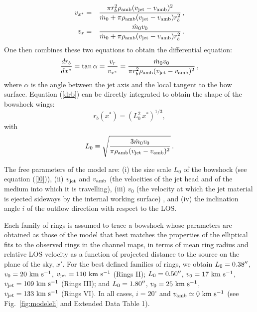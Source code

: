 \documentclass[12pt]{mythesis}
\begin{document}
\begin{eqnarray}
	v_{x^*} & = &\frac{\pi r_b^2\rho_{\rm amb}(v_{\rm jet}-v_{\rm amb})^2}{\dot m_0+\pi\rho_{\rm amb}(v_{\rm jet}-v_{\rm amb})r_b^2}\,, \label{vx} \\ 
	v_r & = & \frac{{\dot m}_0v_0}{\dot m_0+\pi\rho_{\rm amb}(v_{\rm jet}-v_{\rm amb})r_b^2}\,.
  \label{vr}
\end{eqnarray}
One then combines these two equations to obtain the differential equation:
\begin{equation}
	\frac{dr_b}{dx^*}=\tan \alpha=\frac{v_r}{v_{x^*}}=\frac{{\dot m}_0v_0}
	{\pi r_b^2\rho_{\rm amb}(v_{\rm jet}-v_{\rm amb})^2}\,,
    \label{drb}
\end{equation}
where $\alpha$ is the angle between the jet axis and the local tangent to the bow surface. Equation (\ref{drb}) can be directly integrated to obtain the shape of the bowshock wings:
\begin{equation}
	r_b(x^*)=\left(L_0^2\, x^*\right)^{1/3},
  \label{rb}
\end{equation}
with
\begin{equation}
	L_0\equiv \sqrt{\frac{3{\dot m}_0 v_0}{\pi\rho_{\rm amb}(v_{\rm jet}-v_{\rm amb})^2}}\,.
  \label{l0}
\end{equation}


The free parameters of the model are: (i) the size scale $L_0$ of the bowshock (see equation (\ref{l0})), (ii) $v_{\rm jet}$ and $v_{\rm amb}$ (the velocities of the jet head and of the medium into which it is travelling), (iii) $v_0$ (the velocity at which the jet material is ejected sideways by the internal working surface)%
, and (iv) the inclination angle $i$
of the outflow direction with respect to the LOS.

Each family of rings is assumed to trace a bowshock whose parameters are obtained as those of the model that best matches the properties of the elliptical fits to the observed rings in the channel maps, in terms of mean ring radius and relative LOS velocity as a function of projected distance to the source on the plane of the sky, $x'$. For the best defined families of rings, we obtain $L_0=0.38\mbox{$^{\prime\prime}$}$, $v_0=20~\mbox{km s$^{-1}$}$, $v_{\rm jet}=110~\mbox{km s$^{-1}$}$ (Rings II); $L_0=0.50\mbox{$^{\prime\prime}$}$, $v_0=17~\mbox{km s$^{-1}$}$, $v_{\rm jet}=109~\mbox{km s$^{-1}$}$ (Rings III); and $L_0=1.80\mbox{$^{\prime\prime}$}$, $v_0=25~\mbox{km s$^{-1}$}$, $v_{\rm jet}=133~\mbox{km s$^{-1}$}$ (Rings VI). In all cases, $i=20^\circ$ and $v_{\rm amb} \simeq 0~\mbox{km s$^{-1}$}$ (see Fig.~\ref{fig:modeleli} and Extended Data Table 1).
\end{document}
